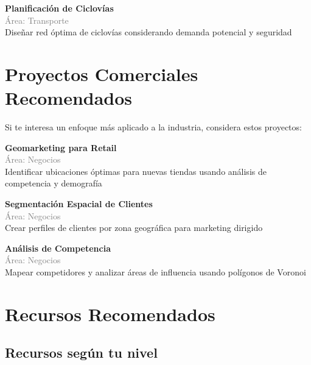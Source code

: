 \documentclass[11pt,a4paper]{article}
\begin{document}
\begin{tcolorbox}[colback=green!5,colframe=darkgreen,title={\small Proyecto Científico \#3}]
\textbf{Planificación de Ciclovías}\\[0.2cm]
\textcolor{gray}{\small Área: Transporte}\\[0.2cm]
Diseñar red óptima de ciclovías considerando demanda potencial y seguridad
\end{tcolorbox}


\section*{ Proyectos Comerciales Recomendados}

Si te interesa un enfoque más aplicado a la industria, considera estos proyectos:


\begin{tcolorbox}[colback=orange!5,colframe=darkorange,title={\small Proyecto Comercial \#1}]
\textbf{Geomarketing para Retail}\\[0.2cm]
\textcolor{gray}{\small Área: Negocios}\\[0.2cm]
Identificar ubicaciones óptimas para nuevas tiendas usando análisis de competencia y demografía
\end{tcolorbox}


\begin{tcolorbox}[colback=orange!5,colframe=darkorange,title={\small Proyecto Comercial \#2}]
\textbf{Segmentación Espacial de Clientes}\\[0.2cm]
\textcolor{gray}{\small Área: Negocios}\\[0.2cm]
Crear perfiles de clientes por zona geográfica para marketing dirigido
\end{tcolorbox}


\begin{tcolorbox}[colback=orange!5,colframe=darkorange,title={\small Proyecto Comercial \#3}]
\textbf{Análisis de Competencia}\\[0.2cm]
\textcolor{gray}{\small Área: Negocios}\\[0.2cm]
Mapear competidores y analizar áreas de influencia usando polígonos de Voronoi
\end{tcolorbox}


\section*{ Recursos Recomendados}

\subsection*{Recursos según tu nivel}
\end{document}
